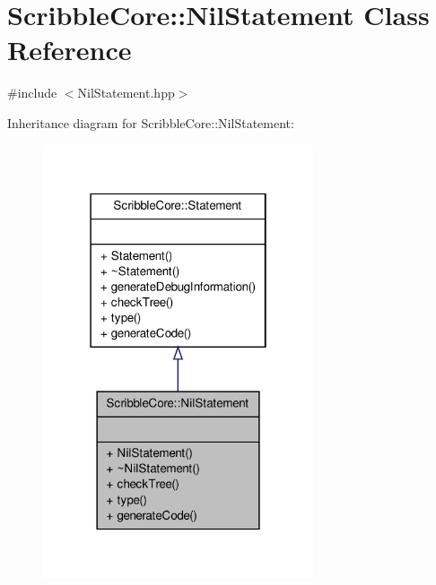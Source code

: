 \hypertarget{class_scribble_core_1_1_nil_statement}{\section{Scribble\-Core\-:\-:Nil\-Statement Class Reference}
\label{class_scribble_core_1_1_nil_statement}
}


{\ttfamily \#include $<$Nil\-Statement.\-hpp$>$}



Inheritance diagram for Scribble\-Core\-:\-:Nil\-Statement\-:
\nopagebreak
\begin{figure}[H]
\begin{center}
\leavevmode
\includegraphics[width=226pt]{class_scribble_core_1_1_nil_statement__inherit__graph}
\end{center}
\end{figure}


